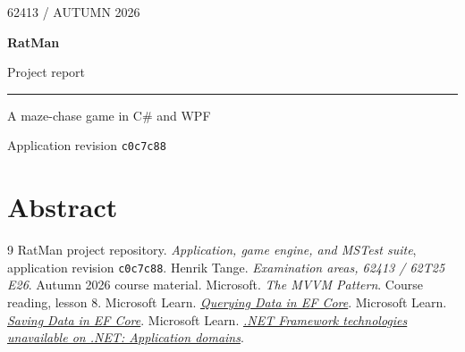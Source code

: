 \documentclass[11pt,a4paper]{article}
\newcommand{\code}[1]{\texttt{#1}}
\begin{document}
\color{ink}
\begin{titlepage}
  \thispagestyle{empty}
  \vspace*{28mm}
  {\large\sffamily\color{accent} 62413 \enspace / \enspace AUTUMN 2026\par}
  \vspace{12mm}
  {\sffamily\bfseries\fontsize{60}{65}\selectfont RatMan\par}
  \vspace{2mm}
  {\LARGE Project report\par}
  \vspace{8mm}
  {\color{accent}\rule{33mm}{1.2pt}\par}
  \vspace{7mm}
  {\large A maze-chase game in C\# and WPF\par}
  \vfill
  {\small\sffamily\color{muted} Application revision \code{c0c7c88}\par}
\end{titlepage}

\setcounter{page}{2}
\section*{Abstract}


{\setlength{\parskip}{0pt}\small\tableofcontents}
\clearpage

{}
\begin{thebibliography}{9}
   RatMan project repository. \emph{Application, game engine, and MSTest suite}, application revision \code{c0c7c88}.
   Henrik Tange. \emph{Examination areas, 62413 / 62T25 E26}. Autumn 2026 course material.
   Microsoft. \emph{The MVVM Pattern}. Course reading, lesson 8.
   Microsoft Learn. \href{https://learn.microsoft.com/en-us/ef/core/querying/}{\emph{Querying Data in EF Core}}.
   Microsoft Learn. \href{https://learn.microsoft.com/en-us/ef/core/saving/}{\emph{Saving Data in EF Core}}.
   Microsoft Learn. \href{https://learn.microsoft.com/en-us/dotnet/core/porting/net-framework-tech-unavailable\#application-domains}{\emph{.NET Framework technologies unavailable on .NET: Application domains}}.
\end{thebibliography}
\end{document}
